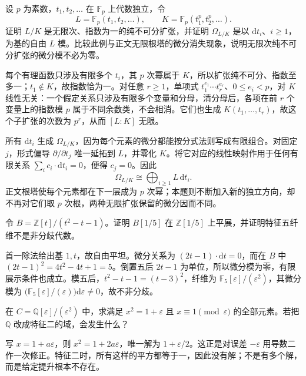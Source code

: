 \begin{exercise}\label{b3:ex:14-perfect-closure}
	设 \(p\) 为素数，\(t_1,t_2,\ldots\) 在 \(\mathbb F_p\) 上代数独立，令
	\[
		L=\mathbb F_p(t_1,t_2,\ldots),\qquad K=\mathbb F_p(t_1^p,t_2^p,\ldots).
	\]
	证明 \(L/K\) 是无限次、指数为一的纯不可分扩张，并证明 \(\Omega_{L/K}\) 是以 \(\mathrm{d}t_i\)、\(i\ge1\)，为基的自由 \(L\) 模。比较此例与正文无限根塔的微分消失现象，说明无限次纯不可分扩张的微分模不必为零。
\end{exercise}
\begin{solution}
	每个有理函数只涉及有限多个 \(t_i\)，其 \(p\) 次幂属于 \(K\)，所以扩张纯不可分、指数至多一；\(t_1\notin K\)，故指数恰为一。对任意 \(r\ge1\)，单项式 \(t_1^{e_1}\cdots t_r^{e_r}\)、\(0\le e_i<p\)，对 \(K\) 线性无关：一个假定关系只涉及有限多个变量和分母，清分母后，各项在前 \(r\) 个变量上的指数模 \(p\) 属于不同余数类，不会相消。它们也生成 \(K(t_1,\ldots,t_r)\)，故这个子扩张的次数为 \(p^r\)，从而 \([L:K]\) 无限。

	所有 \(\mathrm{d}t_i\) 生成 \(\Omega_{L/K}\)，因为每个元素的微分都能按分式法则写成有限组合。对固定 \(j\)，形式偏导 \(\partial/\partial t_j\) 唯一延拓到 \(L\)，并零化 \(K\)。将它对应的线性映射作用于任何有限关系 \(\sum_i c_i\cdot\mathrm{d}t_i=0\)，便得 \(c_j=0\)。因此
	\[
		\Omega_{L/K}\cong\bigoplus_{i\ge1}L\,\mathrm{d}t_i.
	\]
	正文根塔使每个元素都在下一层成为 \(p\) 次幂；本题则不断加入新的独立方向，却不再对它们取 \(p\) 次根，两种无限扩张保留的微分因而不同。
\end{solution}

\begin{exercise}\label{b3:ex:14-arithmetic-etale}
	令 \(B=\mathbb Z[t]/(t^2-t-1)\)。证明 \(B[1/5]\) 在 \(\mathbb Z[1/5]\) 上平展，并证明特征五纤维不是非分歧代数。
\end{exercise}
\begin{solution}
	首一除法给出基 \(1,t\)，故自由平坦。微分关系为 \((2t-1)\cdot\mathrm{d}t=0\)，而在 \(B\) 中 \((2t-1)^2=4t^2-4t+1=5\)。倒置五后 \(2t-1\) 为单位，所以微分模为零，有限展示条件也成立。模五后，\(t^2-t-1=(t-3)^2\)，纤维为 \(\mathbb F_5[\varepsilon]/(\varepsilon^2)\)，其微分模为 \(\bigl(\mathbb F_5[\varepsilon]/(\varepsilon)\bigr)\mathrm{d}\varepsilon\ne0\)，故不非分歧。
\end{solution}

\begin{exercise}\label{b3:ex:14-square-zero-newton}
	在 \(C=\mathbb Q[\varepsilon]/(\varepsilon^2)\) 中，求满足 \(x^2=1+\varepsilon\) 且 \(x\equiv1\pmod\varepsilon\) 的全部元素。若把 \(\mathbb Q\) 改成特征二的域，会发生什么？
\end{exercise}
\begin{solution}
	写 \(x=1+a\varepsilon\)，则 \(x^2=1+2a\varepsilon\)，唯一解为 \(1+\varepsilon/2\)。这正是对误差 \(-\varepsilon\) 用导数二作一次修正。特征二时，所有这样的平方都等于一，因此没有解；不是有多个解，而是给定提升根本不存在。
\end{solution}

